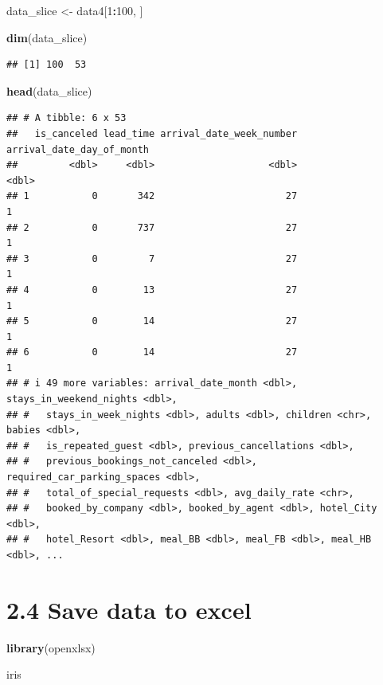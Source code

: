 \documentclass[
]{article}
\newenvironment{Shaded}{\begin{snugshade}}{\end{snugshade}}
\newcommand{\DecValTok}[1]{\textcolor[rgb]{0.00,0.00,0.81}{#1}}
\newcommand{\FunctionTok}[1]{\textcolor[rgb]{0.13,0.29,0.53}{\textbf{#1}}}
\newcommand{\NormalTok}[1]{#1}
\newcommand{\OtherTok}[1]{\textcolor[rgb]{0.56,0.35,0.01}{#1}}
\newcommand{\SpecialCharTok}[1]{\textcolor[rgb]{0.81,0.36,0.00}{\textbf{#1}}}
\begin{document}
\begin{Shaded}
\begin{Highlighting}[]
\NormalTok{data\_slice }\OtherTok{\textless{}{-}}\NormalTok{ data4[}\DecValTok{1}\SpecialCharTok{:}\DecValTok{100}\NormalTok{, ]}

\FunctionTok{dim}\NormalTok{(data\_slice)}
\end{Highlighting}
\end{Shaded}

\begin{verbatim}
## [1] 100  53
\end{verbatim}

\begin{Shaded}
\begin{Highlighting}[]
\FunctionTok{head}\NormalTok{(data\_slice)}
\end{Highlighting}
\end{Shaded}

\begin{verbatim}
## # A tibble: 6 x 53
##   is_canceled lead_time arrival_date_week_number arrival_date_day_of_month
##         <dbl>     <dbl>                    <dbl>                     <dbl>
## 1           0       342                       27                         1
## 2           0       737                       27                         1
## 3           0         7                       27                         1
## 4           0        13                       27                         1
## 5           0        14                       27                         1
## 6           0        14                       27                         1
## # i 49 more variables: arrival_date_month <dbl>, stays_in_weekend_nights <dbl>,
## #   stays_in_week_nights <dbl>, adults <dbl>, children <chr>, babies <dbl>,
## #   is_repeated_guest <dbl>, previous_cancellations <dbl>,
## #   previous_bookings_not_canceled <dbl>, required_car_parking_spaces <dbl>,
## #   total_of_special_requests <dbl>, avg_daily_rate <chr>,
## #   booked_by_company <dbl>, booked_by_agent <dbl>, hotel_City <dbl>,
## #   hotel_Resort <dbl>, meal_BB <dbl>, meal_FB <dbl>, meal_HB <dbl>, ...
\end{verbatim}

\hypertarget{save-data-to-excel}{%
\section{2.4 Save data to excel}\label{save-data-to-excel}}

\begin{Shaded}
\begin{Highlighting}[]
\FunctionTok{library}\NormalTok{(openxlsx)}

\NormalTok{iris}
\end{Highlighting}
\end{Shaded}
\end{document}
